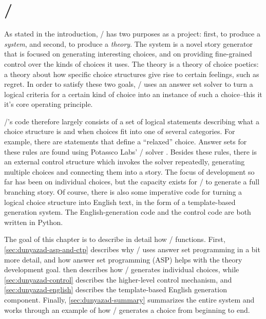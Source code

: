 \chapter{\dunyazad/}

\label{ch:dunyazad}

As stated in the introduction, \dunyazad/ has two purposes as a project: first, to produce a \emph{system}, and second, to produce a \emph{theory}.
%
The system is a novel story generator that is focused on generating interesting choices, and on providing fine-grained control over the kinds of choices it uses.
%
The theory is a theory of choice poetics: a theory about how specific choice structures give rise to certain feelings, such as regret.
%
In order to satisfy these two goals, \dunyazad/ uses an answer set solver to turn a logical criteria for a certain kind of choice into an instance of such a choice--this it it's core operating principle.


\dunyazad/'s code therefore largely consists of a set of logical statements describing what a choice structure is and when choices fit into one of several categories.
%
For example, there are statements that define a ``relaxed'' choice.
%
Answer sets for these rules are found using Potassco Labs' \clingo/ solver \cite{Gebser2011}.
%
Besides these rules, there is an external control structure which invokes the solver repeatedly, generating multiple choices and connecting them into a story.
%
The focus of development so far has been on individual choices, but the capacity exists for \dunyazad/ to generate a full branching story.
%
Of course, there is also some imperative code for turning a logical choice structure into English text, in the form of a template-based generation system.
%
The English-generation code and the control code are both written in Python.


The goal of this chapter is to describe in detail how \dunyazad/ functions.
%
First, \cref{sec:dunyazad-asp-and-ctp} describes why \dunyazad/ uses answer set programming in a bit more detail, and how answer set programming (ASP) helps with the theory development goal.
%
 then describes how \dunyazad/ generates individual choices, while \cref{sec:dunyazad-control} describes the higher-level control mechanism, and \cref{sec:dunyazad-english} describes the template-based English generation component.
%
Finally, \cref{sec:dunyazad-summary} summarizes the entire system and works through an example of how \dunyazad/ generates a choice from beginning to end.


